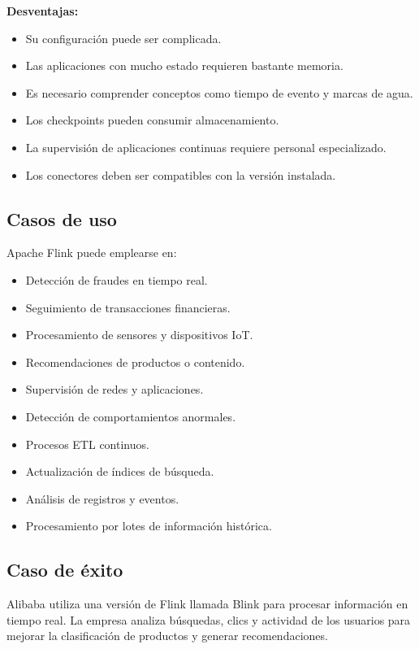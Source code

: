 \textbf{Desventajas:}

\begin{itemize}
    \item Su configuración puede ser complicada.
    \item Las aplicaciones con mucho estado requieren bastante memoria.
    \item Es necesario comprender conceptos como tiempo de evento y marcas de
    agua.
    \item Los checkpoints pueden consumir almacenamiento.
    \item La supervisión de aplicaciones continuas requiere personal
    especializado.
    \item Los conectores deben ser compatibles con la versión instalada.
\end{itemize}

\subsection{Casos de uso}

Apache Flink puede emplearse en:

\begin{itemize}
    \item Detección de fraudes en tiempo real.
    \item Seguimiento de transacciones financieras.
    \item Procesamiento de sensores y dispositivos IoT.
    \item Recomendaciones de productos o contenido.
    \item Supervisión de redes y aplicaciones.
    \item Detección de comportamientos anormales.
    \item Procesos ETL continuos.
    \item Actualización de índices de búsqueda.
    \item Análisis de registros y eventos.
    \item Procesamiento por lotes de información histórica.
\end{itemize}

\subsection{Caso de éxito}

Alibaba utiliza una versión de Flink llamada Blink para procesar información
en tiempo real. La empresa analiza búsquedas, clics y actividad de los usuarios
para mejorar la clasificación de productos y generar recomendaciones.

